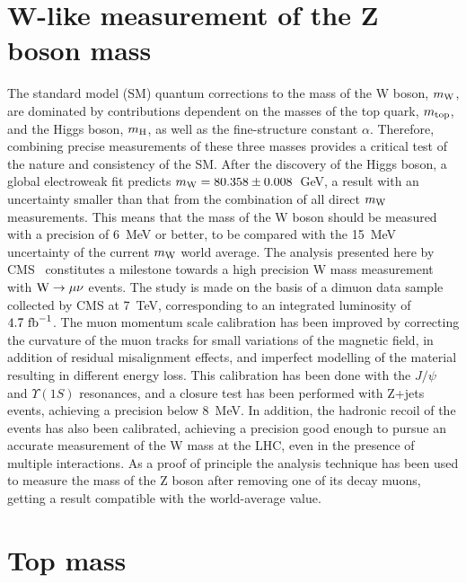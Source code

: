 \documentclass{blois}
\begin{document}
\section{W-like measurement of the Z boson mass}

The standard model (SM) quantum corrections to the mass of the W boson, $m_{\rm W}$,
are dominated by contributions dependent on the masses of the top quark,
$m_{\rm top}$, and the Higgs boson, $m_{\rm H}$, as well as the fine-structure
constant $\alpha$. Therefore, combining precise measurements of these three masses
provides a critical test of the nature and consistency of the SM. After the discovery
of the Higgs boson, a global electroweak fit predicts $m_{\rm W} = 80.358 \pm 0.008$~GeV,
a result with an uncertainty smaller than that from the combination of all direct
$m_{\rm W}$ measurements. This means that the mass of the W boson should be
measured with a precision of 6~MeV or better, to be compared with the 15~MeV
uncertainty of the current $m_{\rm W}$ world average. The analysis presented
here by CMS~\cite{bib:CMS-detector,bib:CMS-WlikeZmass} constitutes a milestone towards a high
precision W mass measurement with
${\rm W\to\mu\nu}$ events. The study is made on the basis of a dimuon data sample
collected by CMS at 7~TeV, corresponding to an integrated luminosity of
$4.7~{\rm fb}^{-1}$. The muon momentum scale calibration has been improved by
correcting the curvature of the muon tracks for small variations of the magnetic
field, in addition of residual misalignment effects, and imperfect modelling of
the material resulting in different energy loss. This calibration has been done
with the $J/\psi$ and $\Upsilon(1S)$ resonances, and a closure test has been
performed with Z+jets events, achieving a precision below 8~MeV. In addition,
the hadronic recoil of the events has also been calibrated, achieving
a precision good enough to pursue an accurate measurement of the W mass
at the LHC, even in the presence of multiple interactions. As a proof of principle
the analysis technique has been used to measure the mass of the Z boson after
removing one of its decay muons, getting a result compatible with the
world-average value.


\section{Top mass}
\end{document}
